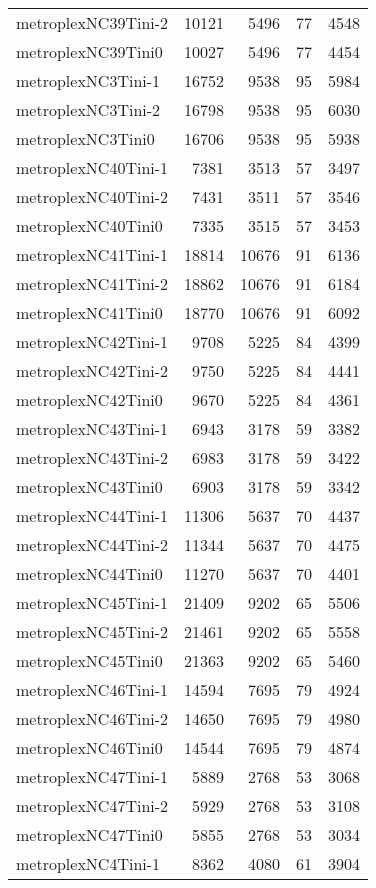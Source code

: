 \begin{longtable}{lrrrr}
metroplexNC39Tini-2 & 10121 & 5496 & 77 & 4548 \\
metroplexNC39Tini0 & 10027 & 5496 & 77 & 4454 \\
metroplexNC3Tini-1 & 16752 & 9538 & 95 & 5984 \\
metroplexNC3Tini-2 & 16798 & 9538 & 95 & 6030 \\
metroplexNC3Tini0 & 16706 & 9538 & 95 & 5938 \\
metroplexNC40Tini-1 & 7381 & 3513 & 57 & 3497 \\
metroplexNC40Tini-2 & 7431 & 3511 & 57 & 3546 \\
metroplexNC40Tini0 & 7335 & 3515 & 57 & 3453 \\
metroplexNC41Tini-1 & 18814 & 10676 & 91 & 6136 \\
metroplexNC41Tini-2 & 18862 & 10676 & 91 & 6184 \\
metroplexNC41Tini0 & 18770 & 10676 & 91 & 6092 \\
metroplexNC42Tini-1 & 9708 & 5225 & 84 & 4399 \\
metroplexNC42Tini-2 & 9750 & 5225 & 84 & 4441 \\
metroplexNC42Tini0 & 9670 & 5225 & 84 & 4361 \\
metroplexNC43Tini-1 & 6943 & 3178 & 59 & 3382 \\
metroplexNC43Tini-2 & 6983 & 3178 & 59 & 3422 \\
metroplexNC43Tini0 & 6903 & 3178 & 59 & 3342 \\
metroplexNC44Tini-1 & 11306 & 5637 & 70 & 4437 \\
metroplexNC44Tini-2 & 11344 & 5637 & 70 & 4475 \\
metroplexNC44Tini0 & 11270 & 5637 & 70 & 4401 \\
metroplexNC45Tini-1 & 21409 & 9202 & 65 & 5506 \\
metroplexNC45Tini-2 & 21461 & 9202 & 65 & 5558 \\
metroplexNC45Tini0 & 21363 & 9202 & 65 & 5460 \\
metroplexNC46Tini-1 & 14594 & 7695 & 79 & 4924 \\
metroplexNC46Tini-2 & 14650 & 7695 & 79 & 4980 \\
metroplexNC46Tini0 & 14544 & 7695 & 79 & 4874 \\
metroplexNC47Tini-1 & 5889 & 2768 & 53 & 3068 \\
metroplexNC47Tini-2 & 5929 & 2768 & 53 & 3108 \\
metroplexNC47Tini0 & 5855 & 2768 & 53 & 3034 \\
metroplexNC4Tini-1 & 8362 & 4080 & 61 & 3904 \\

\end{longtable}
